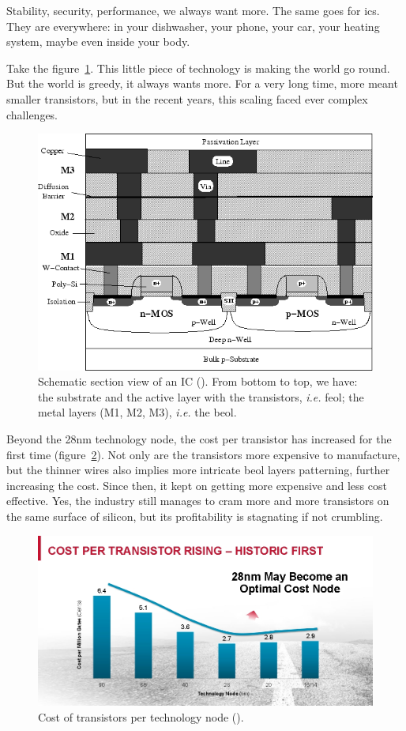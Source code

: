 \documentclass[11pt,a4paper]{report} %
\theoremstyle{customdef}
\begin{document}
Stability, security, performance, we always want more.
The same goes for \glspl{ic}.
They are everywhere: in your dishwasher, your phone, your car, your heating system, maybe even inside your body.

Take the figure~\ref{fig:trans}.
This little piece of technology is making the world go round.
But the world is greedy, it always wants more.
For a very long time, more meant smaller transistors, but in the recent years, this scaling faced ever complex challenges.

\begin{figure}[!h]
\centering
\includegraphics[width=.8\textwidth]{img/trans.png}
\caption{Schematic section view of an IC (\citet{Wittmann2007}).
From bottom to top, we have: the substrate and the active layer with the transistors, \textit{i.e.} \gls{feol}; the metal layers (M1, M2, M3), \textit{i.e.} the \gls{beol}.}
\label{fig:trans}
\end{figure}

Beyond the 28nm technology node, the cost per transistor has increased for the first time (figure~\ref{fig:cost-trans}).
Not only are the transistors more expensive to manufacture, but the thinner wires also implies more intricate \gls{beol} layers patterning, further increasing the cost.
Since then, it kept on getting more expensive and less cost effective.
Yes, the industry still manages to cram more and more transistors on the same surface of silicon, but its profitability is stagnating if not crumbling.

\begin{figure}[!h]
\centering
\includegraphics[width=.8\textwidth]{img/cost-trans.jpg}
\caption{Cost of transistors per technology node (\citep{electroiq2014}).}
\label{fig:cost-trans}
\end{figure}
\end{document}

